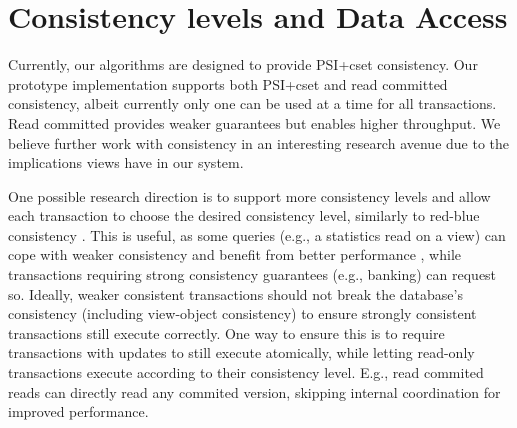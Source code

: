 \section{Consistency levels and Data Access}
\label{sec:consistency_levels}


Currently, our algorithms are designed to provide PSI+cset consistency.
Our prototype implementation supports both PSI+cset and read committed consistency, albeit currently only one can be used at a time for all transactions.
Read committed provides weaker guarantees but enables higher throughput.
We believe further work with consistency in an interesting research avenue due to the implications views have in our system. 

One possible research direction is to support more consistency levels and allow each transaction to choose the desired consistency level, similarly to red-blue consistency \cite{li2012making}.
This is useful, as some queries (e.g., a statistics read on a view) can cope with weaker consistency and benefit from better performance , while transactions requiring strong consistency guarantees (e.g., banking) can request so.
Ideally, weaker consistent transactions should not break the database's consistency (including view-object consistency) to ensure strongly consistent transactions still execute correctly.
One way to ensure this is to require transactions with updates to still execute atomically, while letting read-only transactions execute according to their consistency level.
E.g., read commited reads can directly read any commited version, skipping internal coordination for improved performance.

